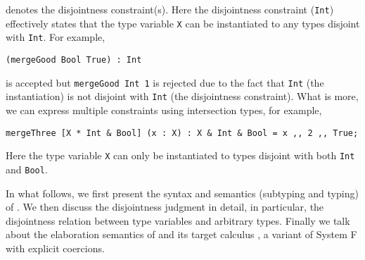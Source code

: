 denotes the disjointness constraint(s). Here the disjointness constraint
(\lstinline{Int}) effectively states that the type variable \lstinline{X} can be
instantiated to any types disjoint with \lstinline{Int}. For example,
\begin{lstlisting}
(mergeGood Bool True) : Int
\end{lstlisting}
is accepted but \lstinline{mergeGood Int 1} is rejected due to the fact that \lstinline{Int} (the instantiation) is not disjoint with
\lstinline{Int} (the disjointness constraint). What is more, we can express multiple
constraints using intersection types, for example,
\begin{lstlisting}
mergeThree [X * Int & Bool] (x : X) : X & Int & Bool = x ,, 2 ,, True;
\end{lstlisting}
Here the type variable \lstinline{X} can only be instantiated to types disjoint with both
\lstinline{Int} and \lstinline{Bool}.

In what follows, we first present the syntax and semantics (subtyping and typing) of \fnamee. We
then discuss the disjointness judgment in detail, in particular, the
disjointness relation between type variables and arbitrary types. Finally we
talk about the elaboration semantics of \fnamee and its target calculus \tnamee,
a variant of System F with explicit coercions.



